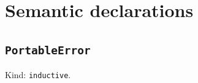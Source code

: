 \documentclass[11pt]{article}
\begin{document}
\section*{Semantic declarations}
\subsection*{\texttt{PortableError}}
\noindent Kind: \texttt{inductive}.\par
\end{document}
